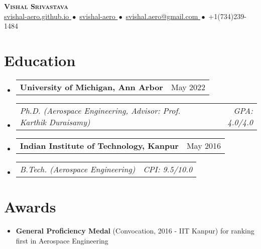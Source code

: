 \documentclass[letterpaper, 11pt]{article}
\makeatletter
\newcommand{\resumeItem}[1]{
  \item\small{{#1\vspace{-2pt}}}
}
\newcommand{\resumeStint}[2]{
  \vspace{-2pt}\item
    \begin{tabular*}{0.97\textwidth}[t]{@{}l@{\extracolsep{\fill}}r}
    \textbf{\small #1} & {\small #2}
  \end{tabular*}\vspace{-7pt}
}
\newcommand{\resumeSubstint}[2]{
  \vspace{-16pt}\item
    \begin{tabular*}{0.97\textwidth}[t]{@{}l@{\extracolsep{\fill}}r}
    {\textit{\small#1}}&{\textit{\small#2}}
  \end{tabular*}%
}
\newcommand{\resumeSubHeadingListStart}{\begin{itemize}[leftmargin=0.15in, label={}]}
\newcommand{\resumeSubHeadingListEnd}{\end{itemize}}
\makeatother
\begin{document}

  \vspace*{0.25in}


  \begin{center}
    \textbf{\Huge\scshape Vishal Srivastava}\\
    \vspace{8pt}\small
    \href{https://svishal-aero.github.io}{
      svishal-aero.github.io
    }${ }{ }\bullet{ }{ }$
    \href{https://linkedin.com/in/svishal-aero/}{
      svishal-aero
    }${ }{ }\bullet{ }{ }$
    \href{mailto:svishal.aero@gmail.com}{
      svishal.aero@gmail.com
    }${ }{ }\bullet{ }{ }$
    +1$ $(734)$ $239-1484
  \end{center}


  \section{Education}
  \resumeSubHeadingListStart
    \resumeStint
    {University of Michigan, Ann Arbor}{May 2022}
    \resumeSubstint
    {Ph.D. (Aerospace Engineering, Advisor: Prof. Karthik Duraisamy)}{GPA: 4.0/4.0}
    \vspace{3pt}
    \resumeStint
    {Indian Institute of Technology, Kanpur}{May 2016}
    \resumeSubstint
    {B.Tech. (Aerospace Engineering)}{CPI: 9.5/10.0}
  \resumeSubHeadingListEnd


  \section{Awards}
  \resumeSubHeadingListStart
    \resumeItem{
      \textbf{General Proficiency Medal} (Convocation, 2016 - IIT Kanpur) for ranking first in
      Aerospace Engineering
    }
  \resumeSubHeadingListEnd

\end{document}
